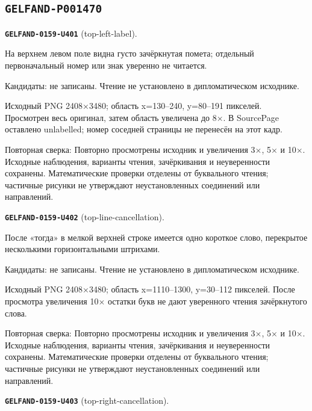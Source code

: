 \subsection*{\texttt{GELFAND-P001470}}
\par\noindent\leavevmode{}\label{GELFAND-0159-U401}\label{GELFAND-P001470:top-left-label}\textbf{\texttt{GELFAND-0159-U401}} (top-left-label).\nopagebreak[4]\par
На верхнем левом поле видна густо зачёркнутая помета; отдельный первоначальный номер или знак уверенно не читается.\par
Кандидаты: не записаны. Чтение не установлено в дипломатическом исходнике.\par
Исходный PNG 2408×3480; область x=130–240, y=80–191 пикселей. Просмотрен весь оригинал, затем область увеличена до 8×. В SourcePage оставлено unlabelled; номер соседней страницы не перенесён на этот кадр.\par
Повторная сверка: Повторно просмотрены исходник и увеличения 3×, 5× и 10×. Исходные наблюдения, варианты чтения, зачёркивания и неуверенности сохранены. Математические проверки отделены от буквального чтения; частичные рисунки не утверждают неустановленных соединений или направлений.\par\medskip
\par\noindent\leavevmode{}\label{GELFAND-0159-U402}\label{GELFAND-P001470:top-line-cancellation}\textbf{\texttt{GELFAND-0159-U402}} (top-line-cancellation).\nopagebreak[4]\par
После «тогда» в мелкой верхней строке имеется одно короткое слово, перекрытое несколькими горизонтальными штрихами.\par
Кандидаты: не записаны. Чтение не установлено в дипломатическом исходнике.\par
Исходный PNG 2408×3480; область x=1110–1300, y=30–112 пикселей. После просмотра увеличения 10× остатки букв не дают уверенного чтения зачёркнутого слова.\par
Повторная сверка: Повторно просмотрены исходник и увеличения 3×, 5× и 10×. Исходные наблюдения, варианты чтения, зачёркивания и неуверенности сохранены. Математические проверки отделены от буквального чтения; частичные рисунки не утверждают неустановленных соединений или направлений.\par\medskip
\par\noindent\leavevmode{}\label{GELFAND-0159-U403}\label{GELFAND-P001470:top-right-cancellation}\textbf{\texttt{GELFAND-0159-U403}} (top-right-cancellation).\nopagebreak[4]\par
